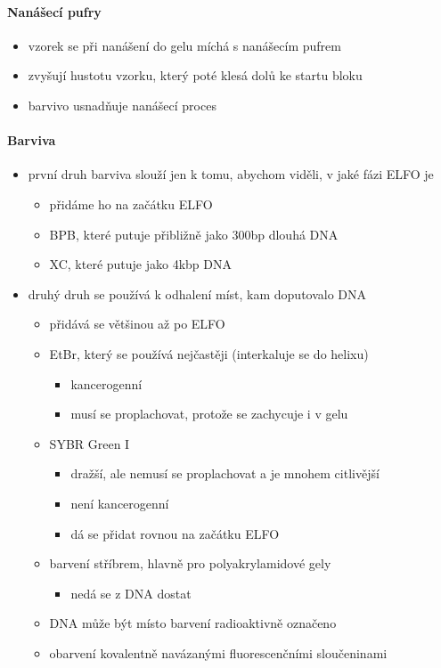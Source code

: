 \documentclass[DIV=8]{scrreprt}
\begin{document}
\paragraph{Nanášecí pufry}
\begin{itemize}[nosep]
    \item vzorek se při nanášení do gelu míchá s nanášecím pufrem
    \item zvyšují hustotu vzorku, který poté klesá dolů ke startu bloku
    \item barvivo usnadňuje nanášecí proces
\end{itemize}



\paragraph{Barviva}
\begin{itemize}[nosep]
    \item první druh barviva slouží jen k tomu, abychom viděli, v jaké fázi ELFO je
\begin{itemize}[nosep]
    \item přidáme ho na začátku ELFO
    \item BPB, které putuje přibližně jako 300bp dlouhá DNA
    \item XC, které putuje jako 4kbp DNA
\end{itemize}

    \item druhý druh se používá k odhalení míst, kam doputovalo DNA
\begin{itemize}[nosep]
    \item přidává se většinou až po ELFO
    \item EtBr, který se používá nejčastěji (interkaluje se do helixu)
\begin{itemize}[nosep]
    \item kancerogenní
    \item musí se proplachovat, protože se zachycuje i v gelu
\end{itemize}

    \item SYBR Green I
\begin{itemize}[nosep]
    \item dražší, ale nemusí se proplachovat a je mnohem citlivější
    \item není kancerogenní
    \item dá se přidat rovnou na začátku ELFO
\end{itemize}

    \item barvení stříbrem, hlavně pro polyakrylamidové gely
\begin{itemize}[nosep]
    \item nedá se z DNA dostat
\end{itemize}

    \item DNA může být místo barvení radioaktivně označeno
    \item obarvení kovalentně navázanými fluorescenčními sloučeninami
\end{itemize}

\end{itemize}
\end{document}
